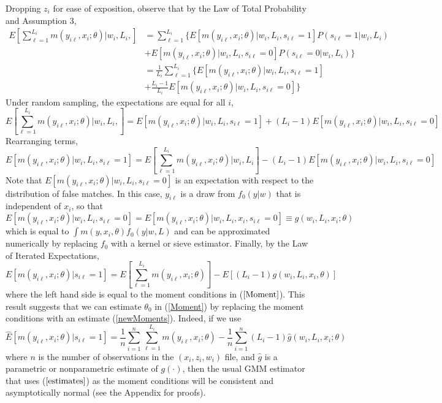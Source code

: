 \documentclass[12pt]{article}
\newcommand{\meanN}{\frac{1}{n}\sum_{i=1}^n}
\newcommand{\sumL}{\sum_{\ell=1}^{L_i}}
\newcommand{\meanL}{\frac{1}{L_i}\sumL}
\begin{document}
Dropping $z_i$ for ease of exposition, observe that by the Law of Total Probability and Assumption 3, 
\begin{align*}
    E\left[\sumL m\left(y_{i\ell}, x_i; \theta\right) \Bigg\vert w_i, L_i, \right] &=
    \sumL \Big\{ E[m(y_{i\ell}, x_i; \theta) | w_i, L_i, s_{i\ell}=1]P(s_{i\ell}=1| w_i, L_i) 
    \\&+ E[m(y_{i\ell}, x_i; \theta) | w_i, L_i, s_{i\ell}=0] P(s_{i\ell}=0| w_i, L_i) \Big\}\\
    &= \meanL \Bigg\{ E[m(y_{i\ell}, x_i; \theta) | w_i, L_i, s_{i\ell} = 1] \\&+ \frac{L_i-1}{L_i}E[m(y_{i\ell}, x_i; \theta) | w_i, L_i, s_{i\ell} = 0] \Bigg\}\end{align*}
Under random sampling, the expectations are equal for all $i$, 
\begin{equation*}
   E\left[\sumL m\left(y_{i\ell}, x_i; \theta\right) \Bigg\vert w_i, L_i, \right] = E\left[m(y_{i\ell}, x_{i}; \theta) | w_i, L_i, s_{i\ell} = 1\right] + (L_i - 1)E\left[m(y_{i\ell}, x_i; \theta) | w_i, L_i, s_{i\ell} =0 \right] 
\end{equation*}
Rearranging terms, 
\begin{equation*} E[m(y_{i\ell}, x_i; \theta) | w_i, L_i, s_{i\ell}=1] = E\left[\sum_{\ell=1}^{L_i} m(y_{i\ell},x_i; \theta)\Bigg\vert w_i, L_i \right] - (L_i-1) E[m(y_{i\ell},x_i; \theta) | w_i, L_i, s_{i\ell} = 0] \end{equation*}
Note that $E[m(y_{i\ell}, x_i; \theta) | w_i, L_i, s_{i\ell} = 0]$ is an expectation with respect to the distribution of false matches.  In this case, $y_{i\ell}$ is a draw from $f_0(y | w)$ that is independent of $x_i$, so that
$$ E[m(y_{i\ell}, x_i; \theta) | w_i, L_i, s_{i\ell} = 0] =  E[m(y_{i\ell}, x_i; \theta) | w_i, L_i, x_i, s_{i\ell} = 0] \equiv g(w_i, L_i, x_i; \theta)$$ 
which is equal to $\int m(y, x_i, \theta)f_0(y | w,L)$ and can be approximated numerically by replacing $f_0$ with a kernel or sieve estimator. Finally, by the Law of Iterated Expectations,
\begin{equation}
E[m(y_{i\ell}, x_i; \theta) | s_{i\ell}=1] = E\left[\sum_{\ell=1}^{L_i} m(y_{i\ell},x_i; \theta)\right] -  E[(L_i -1)g(w_i,L_i,x_i, \theta)] \label{newMoments}
\end{equation}
where the left hand side is equal to the moment conditions in ($\ref{Moment}$).  This result suggests that we can estimate $\theta_0$ in (\ref{Moment}) by replacing the moment conditions with an estimate (\ref{newMoments}).  Indeed, if we use
\begin{equation} \hat{E}\left[m(y_{i\ell}, x_i; \theta) | s_{i\ell} =1\right] = \meanN \sumL m(y_{i\ell}, x_i; \theta) -  \meanN(L_i - 1) \hat{g}(w_i, L_i, x_i; \theta) \label{estimates} \end{equation} 
where $n$ is the number of observations in the $(x_i, z_i, w_i)$ file, and $\hat{g}$ is a parametric or nonparametric estimate of $g(\cdot)$, then the usual GMM estimator that uses ($\ref{estimates}$) as the moment conditions will be consistent and asymptotically normal (see the Appendix for proofs).   
\end{document}
